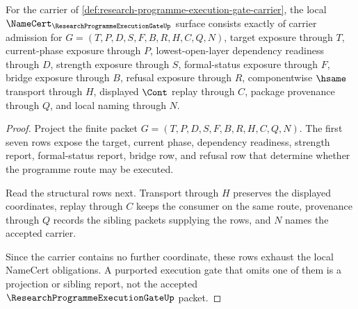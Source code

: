 \begin{theorem}
\label{thm:research-programme-execution-gate-namecert-obligations}
For the carrier of \autoref{def:research-programme-execution-gate-carrier}, the local $\NameCert_{\ResearchProgrammeExecutionGateUp}$ surface consists exactly of carrier admission for $G=(T,P,D,S,F,B,R,H,C,Q,N)$, target exposure through $T$, current-phase exposure through $P$, lowest-open-layer dependency readiness through $D$, strength exposure through $S$, formal-status exposure through $F$, bridge exposure through $B$, refusal exposure through $R$, componentwise $\hsame$ transport through $H$, displayed $\Cont$ replay through $C$, package provenance through $Q$, and local naming through $N$.
\end{theorem}
\begin{proof}
Project the finite packet $G=(T,P,D,S,F,B,R,H,C,Q,N)$. The first seven rows expose the target, current phase, dependency readiness, strength report, formal-status report, bridge row, and refusal row that determine whether the programme route may be executed.

Read the structural rows next. Transport through $H$ preserves the displayed coordinates, replay through $C$ keeps the consumer on the same route, provenance through $Q$ records the sibling packets supplying the rows, and $N$ names the accepted carrier.

Since the carrier contains no further coordinate, these rows exhaust the local NameCert obligations. A purported execution gate that omits one of them is a projection or sibling report, not the accepted $\ResearchProgrammeExecutionGateUp$ packet.
\end{proof}


